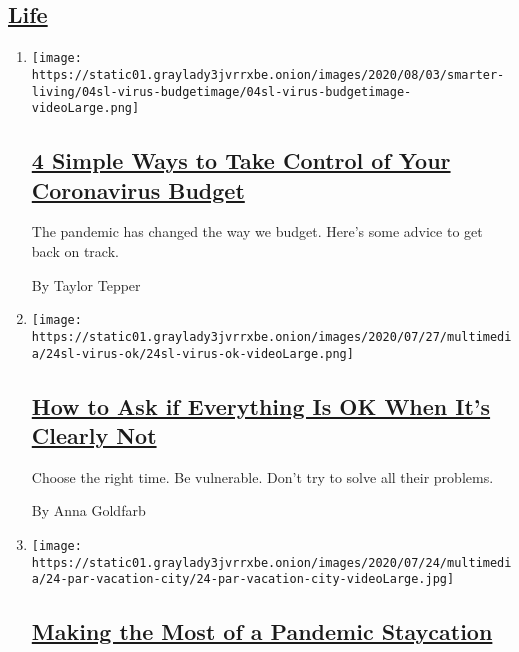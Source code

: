 \hypertarget{life}{%
\subsection{\texorpdfstring{\protect\hyperlink{}{Life}}{Life}}\label{life}}

\begin{enumerate}
\def\labelenumi{\arabic{enumi}.}
\item
  \texttt{[image: https://static01.graylady3jvrrxbe.onion/images/2020/08/03/smarter-living/04sl-virus-budgetimage/04sl-virus-budgetimage-videoLarge.png]}

  \hypertarget{4-simple-ways-to-take-control-of-your-coronavirus-budget}{%
  \subsection{\texorpdfstring{\href{/2020/08/03/smarter-living/coronavirus-budget-save-money.html}{4
  Simple Ways to Take Control of Your Coronavirus
  Budget}}{4 Simple Ways to Take Control of Your Coronavirus Budget}}\label{4-simple-ways-to-take-control-of-your-coronavirus-budget}}

  The pandemic has changed the way we budget. Here's some advice to get
  back on track.

  By Taylor Tepper
\item
  \texttt{[image: https://static01.graylady3jvrrxbe.onion/images/2020/07/27/multimedia/24sl-virus-ok/24sl-virus-ok-videoLarge.png]}

  \hypertarget{how-to-ask-if-everything-is-ok-when-its-clearly-not}{%
  \subsection{\texorpdfstring{\href{/2020/07/28/smarter-living/coronavirus-how-to-check-in-with-a-friend.html}{How
  to Ask if Everything Is OK When It's Clearly
  Not}}{How to Ask if Everything Is OK When It's Clearly Not}}\label{how-to-ask-if-everything-is-ok-when-its-clearly-not}}

  Choose the right time. Be vulnerable. Don't try to solve all their
  problems.

  By Anna Goldfarb
\item
  \texttt{[image: https://static01.graylady3jvrrxbe.onion/images/2020/07/24/multimedia/24-par-vacation-city/24-par-vacation-city-videoLarge.jpg]}

  \hypertarget{making-the-most-of-a-pandemic-staycation}{%
  \subsection{\texorpdfstring{\href{/2020/07/24/parenting/summer-staycation-coronavirus.html}{Making
  the Most of a Pandemic
  Staycation}}{Making the Most of a Pandemic Staycation}}\label{making-the-most-of-a-pandemic-staycation}}


\end{enumerate}
